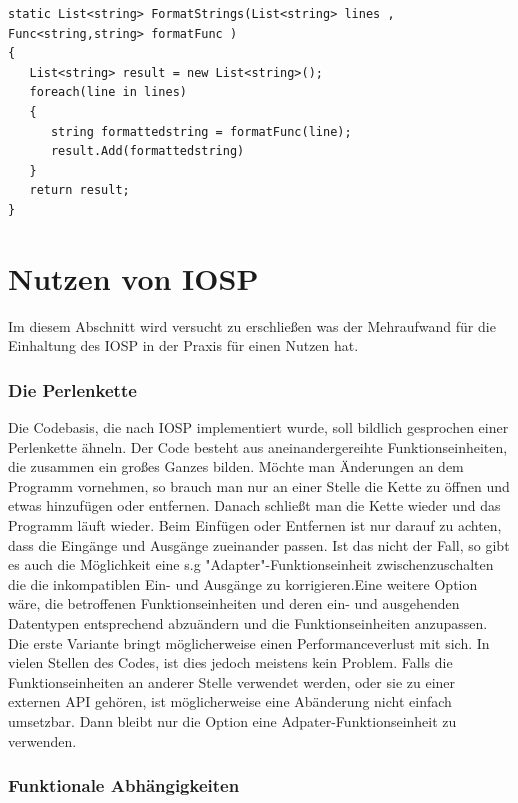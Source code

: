 \begin{lstlisting}
static List<string> FormatStrings(List<string> lines , Func<string,string> formatFunc )
{
   List<string> result = new List<string>();
   foreach(line in lines)
   {
      string formattedstring = formatFunc(line);
      result.Add(formattedstring)
   }
   return result;
}
\end{lstlisting}


\section{Nutzen von IOSP}

Im diesem Abschnitt wird versucht zu erschließen was der Mehraufwand für die
Einhaltung des IOSP in der Praxis für einen Nutzen hat.
\subsubsection{Die Perlenkette}

Die Codebasis, die nach IOSP implementiert wurde, soll bildlich gesprochen einer
Perlenkette ähneln. Der Code besteht aus aneinandergereihte Funktionseinheiten,
die zusammen ein großes Ganzes bilden. Möchte man Änderungen an dem Programm
vornehmen, so brauch man nur an einer Stelle die Kette zu öffnen und etwas
hinzufügen oder entfernen. Danach schließt man die Kette wieder und das Programm
läuft wieder. Beim Einfügen oder Entfernen ist nur darauf zu achten, dass die
Eingänge und Ausgänge zueinander passen. Ist das nicht der Fall, so gibt es auch
die Möglichkeit eine s.g "Adapter"-Funktionseinheit zwischenzuschalten die die inkompatiblen
Ein- und Ausgänge zu korrigieren.Eine weitere Option wäre, die betroffenen
Funktionseinheiten und deren
ein- und ausgehenden Datentypen entsprechend abzuändern und die
Funktionseinheiten anzupassen.
Die erste Variante bringt möglicherweise einen Performanceverlust mit sich.
In vielen Stellen des Codes, ist dies jedoch meistens kein Problem.
Falls die Funktionseinheiten an anderer Stelle verwendet werden, oder sie zu
einer externen API gehören, ist möglicherweise eine Abänderung nicht
einfach umsetzbar. Dann bleibt nur die Option eine Adpater-Funktionseinheit zu verwenden.

\subsubsection{Funktionale Abhängigkeiten}

